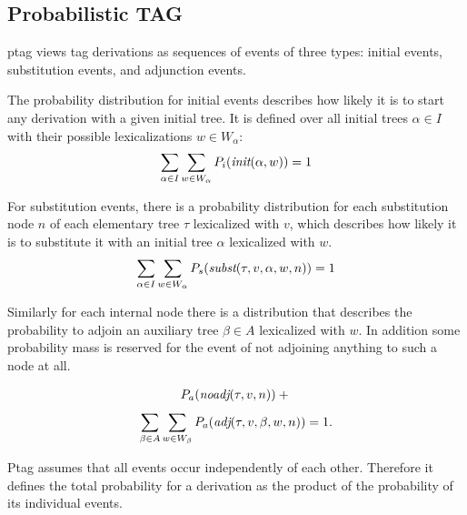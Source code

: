 \subsection{Probabilistic TAG}
\label{ssec:probmodels}
{\sc ptag} \cite{resnik1992} views {\sc tag} derivations as sequences of events of three types: initial events, substitution events, and adjunction events.

The probability distribution for initial events describes how likely it is to start any derivation with a given initial tree. 
It is defined over all initial trees $\alpha \in I$ with their possible lexicalizations $w \in W_\alpha$: 
$$ \sum\limits_{\alpha \in I}\sum\limits_{w \in W_\alpha} P_i(\textit{init}(\alpha, w)) = 1 $$

For substitution events, there is a probability distribution for each substitution node $n$ of each elementary tree $\tau$ lexicalized with $v$, which describes how likely it is to substitute it with an initial tree $\alpha$ lexicalized with $w$. 
$$\sum\limits_{\alpha \in I}\sum\limits_{w \in W_\alpha} P_s(\textit{subst}(\tau,v , \alpha, w, n)) = 1$$

Similarly for each internal node there is a distribution that describes the probability to adjoin an auxiliary tree $\beta \in A$ lexicalized with $w$. In addition some probability mass is reserved for the event of not adjoining anything to such a node at all.

$$ P_a(\textit{noadj}(\tau, v, n)) + \strut$$
$$ \sum\limits_{\beta \in A}\sum\limits_{w \in W_\beta} P_a(\textit{adj}(\tau, v, \beta, w, n)) = 1.$$

{\sc Ptag} assumes that all events occur independently of each other. Therefore it defines the total probability for a derivation as the product of the probability of its individual events. 


